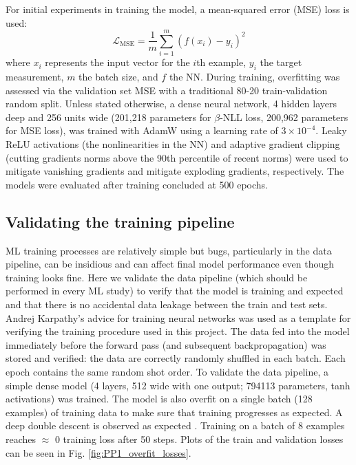 For initial experiments in training the model, a mean-squared error (MSE) loss is used:
\begin{equation}
	\mathcal{L}_\text{MSE}=\frac{1}{m}\sum_{i=1}^m \left(f\left(x_i\right) - y_i \right)^2
\end{equation} 
where $x_i$ represents the input vector for the $i$th example, $y_i$ the target measurement, $m$ the batch size, and $f$ the NN. During training, overfitting was assessed via the validation set MSE with a traditional 80-20 train-validation random split. Unless stated otherwise, a dense neural network, 4 hidden layers deep and 256 units wide (201,218 parameters for $\beta$-NLL loss, 200,962 parameters for MSE loss), was trained with AdamW using a learning rate of $3\times10^{-4}$. Leaky ReLU activations (the nonlinearities in the NN) and adaptive gradient clipping\cite{seetharaman_autoclip_2020} (cutting gradients norms above the 90th percentile of recent norms) were used to mitigate vanishing gradients and mitigate exploding gradients, respectively. The models were evaluated after training concluded at 500 epochs.

\subsection{Validating the training pipeline}

ML training processes are relatively simple but bugs, particularly in the data pipeline, can be insidious and can affect final model performance even though training looks fine. Here we validate the data pipeline (which should be performed in every ML study) to verify that the model is training and expected and that there is no accidental data leakage between the train and test sets. Andrej Karpathy's advice for training neural networks \cite{karpathy_recipe_2019} was used as a template for verifying the training procedure used in this project. The data fed into the model immediately before the forward pass (and subsequent backpropagation) was stored and verified: the data are correctly randomly shuffled in each batch. Each epoch contains the same random shot order. To validate the data pipeline, a simple dense model (4 layers, 512 wide with one output; 794113 parameters, tanh activations) was trained. The model is also overfit on a single batch (128 examples) of training data to make sure that training progresses as expected. A deep double descent is observed as expected \cite{nakkiran_deep_2019,schaeffer_double_2023}. Training on a batch of 8 examples reaches $\approx$ 0 training loss after 50 steps. Plots of the train and validation losses can be seen in Fig. \ref{fig:PP1_overfit_losses}.

